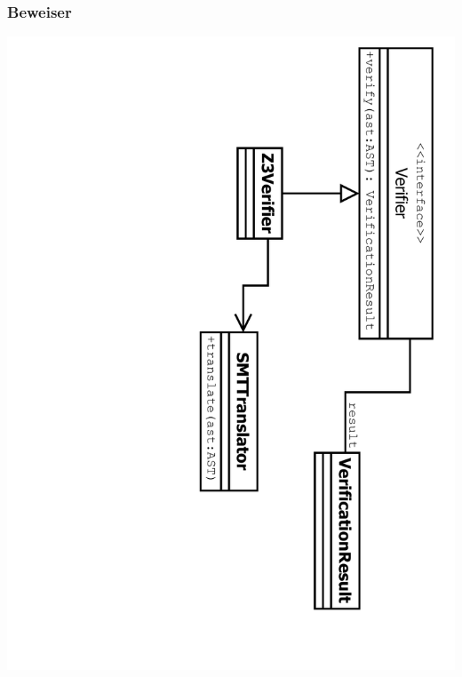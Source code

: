 \documentclass[10pt,a4paper,titlepage]{article}
\begin{document}
\subsubsection{Beweiser}
\includegraphics[angle=90, scale=0.6]{images/ClassVerifier.pdf}
\end{document}
